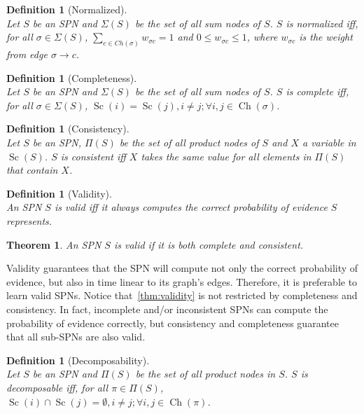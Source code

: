 \documentclass{amsart}
\DeclareMathOperator*{\Ch}{\text{Ch}}
\DeclareMathOperator*{\Sc}{\text{Sc}}
\theoremstyle{plain}
\newcounter{dummy-def}\numberwithin{dummy-def}{section}
\newtheorem{definition}[dummy-def]{Definition}
\newcounter{dummy-thm}\numberwithin{dummy-thm}{section}
\newtheorem{theorem}[dummy-thm]{Theorem}
\newcounter{dummy-prop}\numberwithin{dummy-prop}{section}
\newcounter{dummy-corollary}\numberwithin{dummy-corollary}{section}
\newcounter{dummy-lemma}\numberwithin{dummy-lemma}{section}
\newcounter{dummy-ex}\numberwithin{dummy-ex}{section}
\newcounter{dummy-eg}\numberwithin{dummy-eg}{section}
\numberwithin{equation}{section}
\begin{document}
\begin{definition}[Normalized]~\\
  Let $S$ be an SPN and $\Sigma(S)$ be the set of all sum nodes of $S$. $S$ is normalized iff, for
  all $\sigma \in \Sigma(S)$, $\sum_{c\in Ch(\sigma)} w_{\sigma c} = 1$ and $0 \leq w_{\sigma c}
  \leq 1$, where $w_{\sigma c}$ is the weight from edge $\sigma \to c$.
\end{definition}

\begin{definition}[Completeness]~\\
  Let $S$ be an SPN and $\Sigma(S)$ be the set of all sum nodes of $S$. $S$ is complete iff, for
  all $\sigma \in \Sigma(S)$, $\Sc(i)=\Sc(j), i\neq j; \forall i,j\in \Ch(\sigma)$.
\end{definition}

\begin{definition}[Consistency]~\\
  Let $S$ be an SPN, $\Pi(S)$ be the set of all product nodes of $S$ and $X$ a variable in
  $\Sc(S)$. $S$ is consistent iff $X$ takes the same value for all elements in $\Pi(S)$ that
  contain $X$.
\end{definition}

\begin{definition}[Validity]~\\
  An SPN $S$ is valid iff it always computes the correct probability of evidence $S$ represents.
\end{definition}

\begin{theorem}\label{thm:validity}
  An SPN $S$ is valid if it is both complete and consistent.
\end{theorem}

Validity guarantees that the SPN will compute not only the correct probability of evidence, but
also in time linear to its graph's edges. Therefore, it is preferable to learn valid SPNs. Notice
that~\autoref{thm:validity} is not restricted by completeness and consistency. In fact, incomplete
and/or inconsistent SPNs can compute the probability of evidence correctly, but consistency and
completeness guarantee that all sub-SPNs are also valid.

\begin{definition}[Decomposability]~\\
  Let $S$ be an SPN and $\Pi(S)$ be the set of all product nodes in $S$. $S$ is decomposable iff,
  for all $\pi \in \Pi(S)$, $\Sc(i)\cap \Sc(j)=\emptyset, i\neq j; \forall i,j\in \Ch(\pi)$.
\end{definition}
\end{document}
